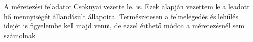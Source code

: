 \begin{formal}






A méretezési feladatot Csoknyai vezette le. \cite[359.~o.]{Herz} is. Ezek alapján vezettem le a leadott hő mennyiségét állandósult állapotra. Természetesen a felmelegedés és lehűlés idejét is figyelembe kell majd venni, de ezzel érthető módon a méretezésnél sem számolnak.

\end{formal}
